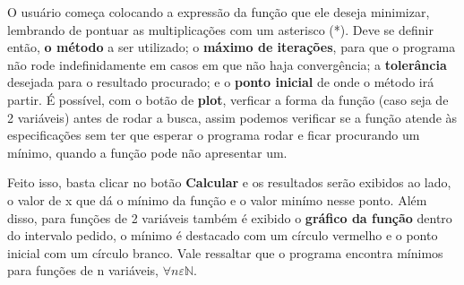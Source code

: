 \par O usuário começa colocando a expressão da função que ele deseja minimizar, lembrando de pontuar as multiplicações com um asterisco (*). Deve se definir então, \textbf{o método} a ser utilizado; o \textbf{máximo de iterações}, para que o programa não rode indefinidamente em casos em que não haja convergência; a \textbf{tolerância} desejada para o resultado procurado; e o \textbf{ponto inicial} de onde o método irá partir. É possível, com o botão de \textbf{plot}, verficar a forma da função (caso seja de 2 variáveis) antes de rodar a busca, assim podemos verificar se a função atende às especificações sem ter que esperar o programa rodar e ficar procurando um mínimo, quando a função pode não apresentar um. \\

\par Feito isso, basta clicar no botão \textbf{Calcular} e os resultados serão exibidos ao lado, o valor de x que dá o mínimo da função e o valor minímo nesse ponto. Além disso, para funções de 2 variáveis também é exibido o \textbf{gráfico da função} dentro do intervalo pedido, o mínimo é destacado com um círculo vermelho e o ponto inicial com um círculo branco. Vale ressaltar que o programa encontra mínimos para funções de n variáveis, $\forall n \varepsilon \mathds{N}$.   \\
